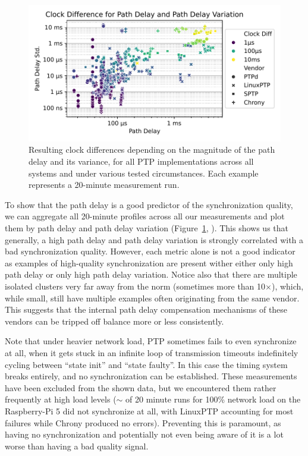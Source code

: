\begin{figure}
    \includegraphics[width=\linewidth]{res/generated/base/clock_diff_by_path_delay.pdf}
    \caption{Resulting clock differences depending on the magnitude of the path delay and its variance, for all PTP implementations across all systems and under various tested circumstances. Each example represents a 20-minute measurement run.}
    \label{fig:path-delay-all}
\end{figure}

To show that the path delay is a good predictor of the synchronization quality, we can aggregate all 20-minute profiles across all our measurements and plot them by path delay and path delay variation (Figure~\ref{fig:path-delay-all}, ). This shows us that generally, a high path delay and path delay variation is strongly correlated with a bad synchronization quality. However, each metric alone is not a good indicator as examples of high-quality synchronization are present wither either only high path delay or only high path delay variation. Notice also that there are multiple isolated clusters very far away from the norm (sometimes more than 10$\times$), which, while small, still have multiple examples often originating from the same vendor. This suggests that the internal path delay compensation mechanisms of these vendors can be tripped off balance more or less consistently.

\newcommand{\loadFaultyNumFailures}{9}
\newcommand{\loadFaultyNumTrials}{34}
Note that under heavier network load, PTP sometimes fails to even synchronize at all, when it gets stuck in an infinite loop of transmission timeouts indefinitely cycling between ``state init'' and ``state faulty''. In this case the timing system breaks entirely, and no synchronization can be established. These measurements have been excluded from the shown data, but we encountered them rather frequently at high load levels ($\sim$\fPercentage{\loadFaultyNumFailures/\loadFaultyNumTrials} of 20 minute runs for 100\% network load on the Raspberry-Pi 5 did not synchronize at all, with LinuxPTP accounting for most failures while Chrony produced no errors). Preventing this is paramount, as having no synchronization and potentially not even being aware of it is a lot worse than having a bad quality signal.

